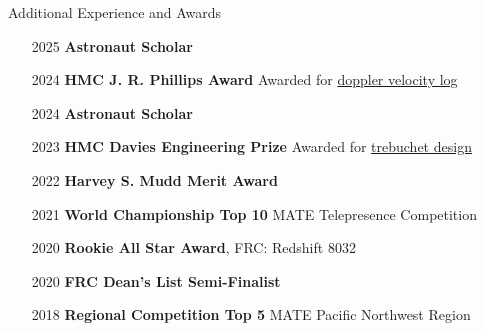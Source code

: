 \documentclass[]{mcdowellcv}
\begin{document}
\begin{cvsection}{Additional Experience and Awards}
	\begin{cvsubsection}{}{}{}
		\begin{itemize}
			\item[2025] \textbf{Astronaut Scholar}
			\item[2024] \textbf{HMC J. R. Phillips Award} Awarded for \hyperlink{doppler_velocity_log}{doppler velocity log}
			\item[2024] \textbf{Astronaut Scholar}
			\item[2023] \textbf{HMC Davies Engineering Prize} Awarded for \hyperlink{trebuchet_design}{trebuchet design}
			\item[2022] \textbf{Harvey S. Mudd Merit Award}
			\item[2021] \textbf{World Championship Top 10} MATE  Telepresence Competition
			\item[2020] \textbf{Rookie All Star Award}, FRC: Redshift 8032
			\item[2020] \textbf{FRC Dean's List Semi-Finalist}
			\item[2018] \textbf{Regional Competition Top 5} MATE Pacific Northwest Region
		\end{itemize}
	\end{cvsubsection}
\end{cvsection}
\end{document}
